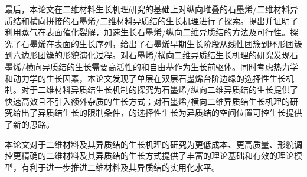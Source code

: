 \begin{chineseabstract}
    最后，本论文在二维材料生长机理研究的基础上对纵向堆叠的石墨烯/二维材料异质结和横向拼接的石墨烯/二维材料异质结的生长机理进行了探索。提出并证明了利用蒸气在表面催化裂解，加速生长石墨烯/纵向二维异质结的方法及可行性。探究了石墨烯在表面的生长序列，给出了石墨烯早期生长阶段从线性团簇到环形团簇到六边形团簇的形貌演化过程。对石墨烯/横向二维异质结生长机理的研究发现石墨烯/横向异质结的生长需要高活性的和自由基作为生长前驱体。同时考虑热力学和动力学的生长因素，本论文发现了单层在双层石墨烯台阶边缘的选择性生长机制。对于二维材料异质结生长机制的探究为石墨烯/纵向二维异质结的生长提供了快速高效且不引入额外杂质的生长方式；对石墨烯/横向二维异质结生长机理的研究给出了异质结生长的限制条件，的选择性生长为异质结的空间位置可控生长提供了新的思路。

    本论文对于二维材料及其异质结的生长机理的研究为更低成本、更高质量、形貌调控更精确的二维材料及其异质结的生长方式提供了丰富的理论基础和有效的理论模型，有利于进一步推进二维材料及其异质结的实用化水平。

\end{chineseabstract}